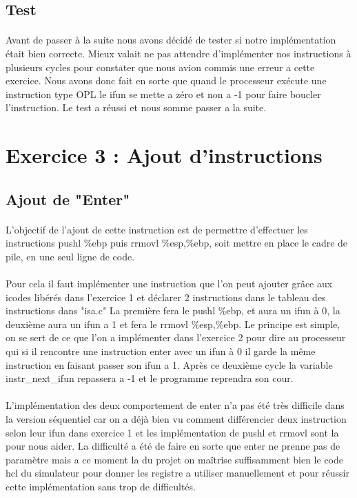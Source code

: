 \documentclass[12pt]{article}
\begin{document}
\subsection{Test} 
\paragraph{} Avant de passer à la suite nous avons décidé de tester si notre implémentation était bien correcte. Mieux valait ne pas attendre d’implémenter nos instructions à plusieurs cycles pour constater que nous avion commis une erreur a cette exercice.
Nous avons donc fait en sorte que quand le processeur exécute une instruction type OPL le ifun se mette a zéro et non a -1 pour faire boucler l'instruction. Le test a réussi et nous somme passer a la suite.

\newpage
\section{Exercice 3 : Ajout d'instructions}
\subsection{Ajout de "Enter"}

\paragraph{}L'objectif de l'ajout de cette instruction est de permettre d'effectuer les instructions pushl \%ebp puis rrmovl \%esp,\%ebp, soit mettre en place le cadre de pile, en une seul ligne de code.

\paragraph{}Pour cela il faut implémenter une instruction que l'on peut ajouter grâce aux icodes libérés dans l'exercice 1 et déclarer 2 instructions dans le tableau des instructions dans "isa.c" La première fera le pushl \%ebp, et aura un ifun à 0, la deuxième aura un ifun a 1 et fera le rrmovl \%esp,\%ebp. Le principe est simple, on se sert de ce que l'on a implémenter dans l’exercice 2 pour dire au processeur qui si il rencontre une instruction enter avec un ifun à 0 il garde la même instruction en faisant passer son ifun a 1. Après ce deuxième cycle la variable instr\_next\_ifun repassera a -1 et le programme reprendra son cour. 

\paragraph{}L'implémentation des deux comportement de enter n'a pas été très difficile dans la version séquentiel car on a déjà bien vu comment différencier deux instruction selon leur ifun dans exercice 1 et les implémentation de pushl et rrmovl sont la pour nous aider. La difficulté a été de faire en sorte que enter ne prenne pas de paramètre mais a ce moment la du projet on maîtrise suffisamment bien le code hcl du simulateur pour donner les registre a utiliser manuellement et pour réussir cette implémentation sans trop de difficultés.
\end{document}
